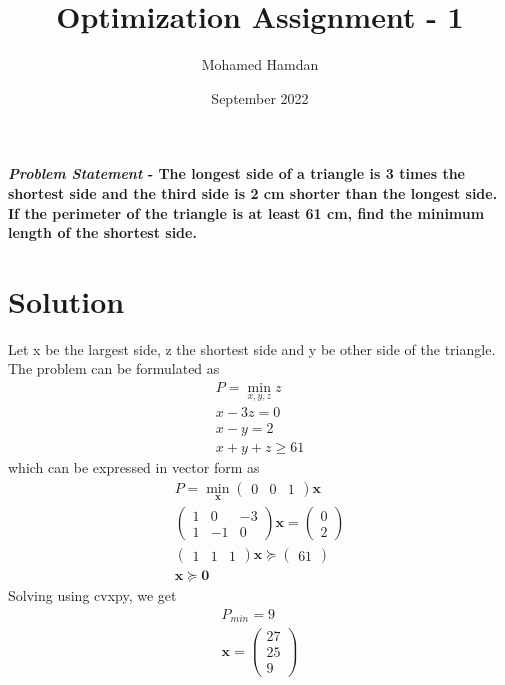 \documentclass[journal,10pt,twocolumn]{article}
\title{\textbf{Optimization Assignment - 1}}
\author{Mohamed Hamdan}
\date{September 2022}
\let\vec\mathbf
\newcommand{\myvec}[1]{\ensuremath{\begin{pmatrix}#1\end{pmatrix}}}
\begin{document}
\maketitle
\paragraph{\textit{Problem Statement} - The longest side of a triangle is 3 times the shortest side and the third side is 2 cm shorter than the longest side. If the perimeter of the triangle is at least 61 cm, find the minimum length of the shortest side.} 

\section*{\large Solution}
Let x be the largest side, z the shortest side and y be other side of the triangle. The problem can be formulated as
\begin{align}
	P = \min_{x,y,z}z\\
	x - 3z = 0\\
	x - y = 2\\
	x + y + z \geq 61
\end{align}
which can be expressed in vector form as
\begin{align}
	P = \min_{\vec{x}}\myvec{0&0&1}\vec{x}\\
	\myvec{1&0&-3\\1&-1&0}\vec{x} = \myvec{0\\2}\\
	\myvec{1&1&1}\vec{x} \succeq \myvec{61}\\
	\vec{x} \succeq \vec{0}
\end{align}
Solving using cvxpy, we get
\begin{align}
	P_{min} = 9\\
	\vec{x} = \myvec{27\\25\\9}
\end{align}
\end{document}
